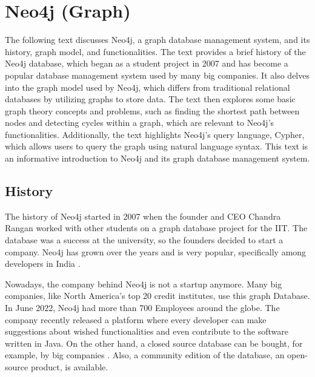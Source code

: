 
\chapter{Neo4j (Graph)} \label{ch:neo4j}

The following text discusses Neo4j, a graph database management system, and its history, graph model, and functionalities. The text provides a brief history of the Neo4j database, which began as a student project in 2007 and has become a popular database management system used by many big companies. It also delves into the graph model used by Neo4j, which differs from traditional relational databases by utilizing graphs to store data. The text then explores some basic graph theory concepts and problems, such as finding the shortest path between nodes and detecting cycles within a graph, which are relevant to Neo4j's functionalities. Additionally, the text highlights Neo4j's query language, Cypher, which allows users to query the graph using natural language syntax. This text is an informative introduction to Neo4j and its graph database management system.

\section{History} \label{sec:historyNeo4j}

The history of Neo4j started in 2007 when the founder and CEO Chandra Rangan worked with other students on a graph database project for the \ac{IIT}. The database was a success at the university, so the founders
decided to start a company. Neo4j has grown over the years and is very popular, specifically among developers in India \parencite{historyneo4j}.

Nowadays, the company behind Neo4j is not a startup anymore. Many big companies, like North America's top 20 credit institutes, use this graph Database. In June 2022, Neo4j had more than 700 Employees around the globe.
The company recently released a platform where every developer can make suggestions about wished functionalities and even contribute
to the software written in Java. On the other hand, a closed source database can be bought, for example, by big companies \parencite{historyneo4j}. Also, a community edition of the database, an open-source product, is available.

